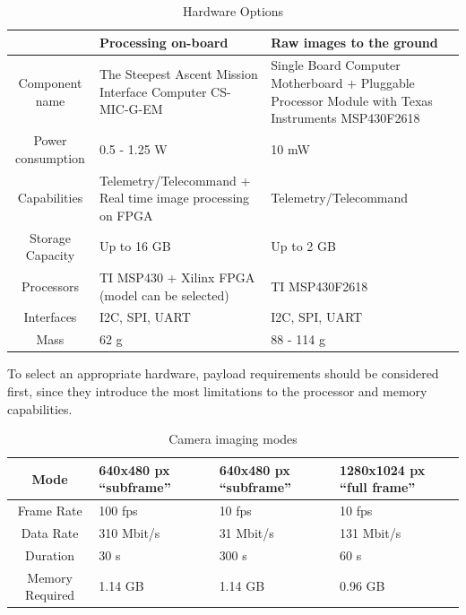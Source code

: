 \documentclass[12pt]{article}
\begin{document}
\begin{table}[ht]
\caption{Hardware Options}
\label{table:avionics_hardware_options}
\begin{center}
    \begin{tabular}{| c || p{6cm} | p{6cm} |} \hline
     &	\textbf{Processing on-board} & \textbf{Raw images to the ground} \\ \hline \hline
    Component name & The Steepest Ascent Mission Interface Computer CS-MIC-G-EM & Single Board Computer Motherboard + Pluggable Processor Module with Texas Instruments MSP430F2618 \\ \hline
    Power consumption & 0.5 - 1.25 W & 10 mW \\ \hline
    Capabilities & Telemetry/Telecommand + Real time image processing on FPGA & Telemetry/Telecommand\\ \hline
    Storage Capacity & Up to 16 GB & Up to 2 GB \\ \hline
    Processors & TI MSP430  + Xilinx FPGA (model can be selected) & TI MSP430F2618 \\ \hline
    Interfaces & I2C, SPI, UART & I2C, SPI, UART \\ \hline
    Mass & 62 g & 88 - 114 g \\ \hline 
    \end{tabular}
\end{center}
\end{table}

To select an appropriate hardware, payload requirements should be considered first, since they introduce the most limitations to the processor and memory capabilities.

\begin{table}[ht]
\caption{Camera imaging modes}
\label{table:avionics_modes}
\begin{center}
    \begin{tabular}{| c || p{3cm} | p{3cm} | p{3cm} |} \hline
    	\textbf{Mode} & \textbf{640x480 px ``subframe''} &  \textbf{640x480 px ``subframe''} & \textbf{1280x1024 px  ``full frame''} \\ \hline \hline
    Frame Rate & 100 fps & 10 fps & 10 fps \\ \hline
    Data Rate & 310 Mbit/s & 31 Mbit/s & 131 Mbit/s \\ \hline
    Duration & 30 s & 300 s & 60 s \\ \hline
    Memory Required & 1.14 GB & 1.14 GB & 0.96 GB \\ \hline 
    \end{tabular}
\end{center}
\end{table}
\end{document}
